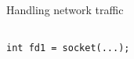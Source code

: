 \documentclass{beamer}
\begin{document}
\begin{frame}[t,fragile]{Handling network traffic}
\begin{columns}
\begin{column}[t]{0.5\textwidth}
\begin{verbatim}
int fd1 = socket(...);
\end{verbatim}
\end{column}
\begin{column}[t]{0.5\textwidth}  %
    \begin{center}
\end{center}
\end{column}
\end{columns}
\end{frame}
\end{document}
